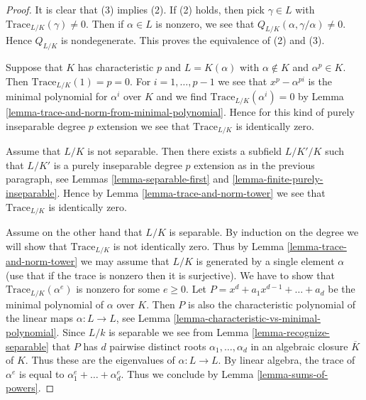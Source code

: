 \begin{proof}
It is clear that (3) implies (2). If (2) holds, then pick $\gamma \in L$
with $\text{Trace}_{L/K}(\gamma) \not = 0$. Then if $\alpha \in L$
is nonzero, we see that $Q_{L/K}(\alpha, \gamma/\alpha) \not = 0$.
Hence $Q_{L/K}$ is nondegenerate. This proves the equivalence of
(2) and (3).

\medskip\noindent
Suppose that $K$ has characteristic $p$ and $L = K(\alpha)$ with
$\alpha \not \in K$ and $\alpha^p \in K$. Then $\text{Trace}_{L/K}(1) = p = 0$.
For $i = 1, \ldots, p - 1$ we see that $x^p - \alpha^{pi}$ is the minimal
polynomial for $\alpha^i$ over $K$ and we find
$\text{Trace}_{L/K}(\alpha^i) = 0$ by
Lemma \ref{lemma-trace-and-norm-from-minimal-polynomial}.
Hence for this kind of purely inseparable degree $p$ extension
we see that $\text{Trace}_{L/K}$ is identically zero.

\medskip\noindent
Assume that $L/K$ is not separable. Then there exists a subfield
$L/K'/K$ such that $L/K'$ is a purely inseparable degree $p$ extension
as in the previous paragraph, see
Lemmas \ref{lemma-separable-first} and \ref{lemma-finite-purely-inseparable}.
Hence by Lemma \ref{lemma-trace-and-norm-tower}
we see that $\text{Trace}_{L/K}$ is identically zero.

\medskip\noindent
Assume on the other hand that $L/K$ is separable.
By induction on the degree we will show that
$\text{Trace}_{L/K}$ is not identically zero.
Thus by Lemma \ref{lemma-trace-and-norm-tower} we may assume that
$L/K$ is generated by a single element $\alpha$ (use that if
the trace is nonzero then it is surjective).
We have to show that $\text{Trace}_{L/K}(\alpha^e)$
is nonzero for some $e \geq 0$.
Let $P = x^d + a_1 x^{d - 1} + \ldots + a_d$ be the minimal
polynomial of $\alpha$ over $K$.
Then $P$ is also the characteristic polynomial of the linear
maps $\alpha : L \to L$, see
Lemma \ref{lemma-characteristic-vs-minimal-polynomial}.
Since $L/k$ is separable we see from Lemma \ref{lemma-recognize-separable}
that $P$ has $d$ pairwise distinct roots $\alpha_1, \ldots, \alpha_d$
in an algebraic closure $\overline{K}$ of $K$. Thus these are the
eigenvalues of $\alpha : L \to L$.
By linear algebra, the trace of $\alpha^e$ is
equal to $\alpha_1^e + \ldots + \alpha_d^e$.
Thus we conclude by Lemma \ref{lemma-sums-of-powers}.
\end{proof}

